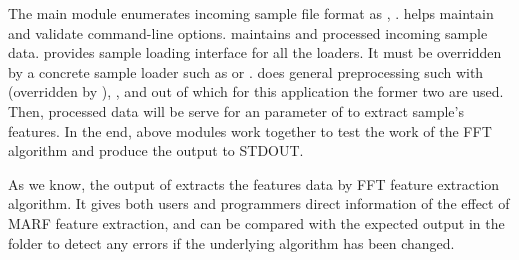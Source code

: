 The main  module enumerates incoming sample file format as
, .  helps maintain and validate
command-line options.  maintains and processed incoming
sample data.  provides sample loading interface for
all the {\marf} loaders. It must be overridden by a concrete sample loader
such as  or .  does general
preprocessing such with  (overridden by ), ,
 and  out of which for this application the
former two are used. Then, processed data will be serve for an parameter of 
to extract sample's features. In the end, above modules work together to test the work of the FFT
algorithm and produce the output to STDOUT.

As we know, the output of  extracts the features data by FFT feature extraction algorithm.
It gives both users and programmers direct information of the effect of MARF feature extraction,
and can be compared with the expected output in the  folder to detect any errors
if the underlying algorithm has been changed.

